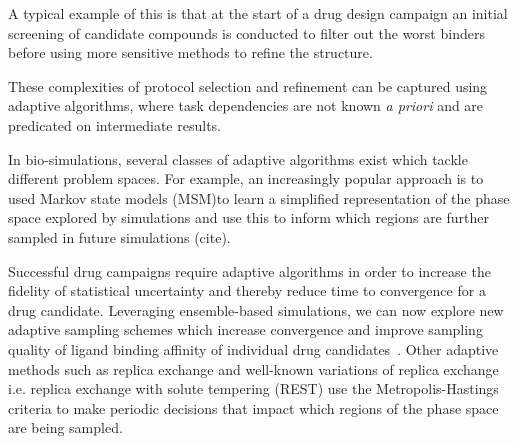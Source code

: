 A typical example of this is that at the start of a drug design campaign
an initial screening of candidate compounds is conducted to filter out the worst 
binders before using more sensitive methods to refine the structure.


These complexities of protocol selection and refinement can be captured using 
adaptive algorithms, where task  dependencies are not known 
\textit{a priori} and are predicated on intermediate results. 

In bio-simulations, several classes of adaptive algorithms exist which tackle
different problem spaces. For example, an increasingly popular approach is to
used Markov state models (MSM)to learn a simplified representation of the
phase space explored by simulations and use this to inform which regions are
further sampled in future simulations (cite).

Successful drug campaigns require adaptive algorithms in order to increase 
the fidelity of statistical uncertainty and thereby reduce time to convergence 
for a drug candidate. 
Leveraging ensemble-based simulations, we can now explore 
new adaptive sampling schemes which increase convergence and improve 
sampling quality of ligand binding affinity of individual drug 
candidates~\cite{DeFabritiis2014}. 
Other adaptive methods such as replica exchange and well-known variations of
replica exchange i.e. replica exchange with solute tempering (REST) use the
Metropolis-Hastings criteria to make periodic decisions that impact which
regions of the phase space are being sampled.


